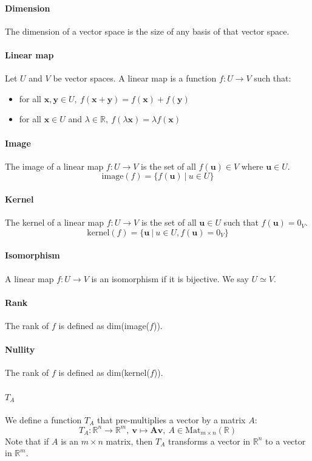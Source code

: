 \documentclass{article}
\newcommand{\R}{\mathbb{R}}
\renewcommand{\vec}[1]{\mathbf{#1}}
\begin{document}
\paragraph{Dimension}
The dimension of a vector space is the size of any basis of that vector space.
\paragraph{Linear map}
Let $ U $ and $ V $ be vector spaces. A linear map is a function $ f : U \to V $ such that:
\begin{itemize}
\item for all $ \vec{x}, \vec{y} \in U, \ f(\vec{x} + \vec{y}) = f(\vec{x}) + f(\vec{y}) $
\item for all $ \vec{x} \in U $ and $ \lambda \in \R, \ f(\lambda \vec{x}) = \lambda f(\vec{x}) $
\end{itemize}
\paragraph{Image}
The image of a linear map $ f : U \to V $ is the set of all $ f(\vec{u}) \in V $ where $ \vec{u} \in U $.
\begin{equation}
\textrm{image}(f) = \{f(\vec{u}) \ | \ u \in U \}
\end{equation}
\paragraph{Kernel}
The kernel of a linear map $ f : U \to V $ is the set of all $ \vec{u} \in U $ such that $ f(\vec{u}) = 0_{V} $.
\begin{equation}
\textrm{kernel}(f) = \{\vec{u} \ | \ u \in U, f(\vec{u}) = 0_{V} \}
\end{equation}
\paragraph{Isomorphism}
A linear map $ f : U \to V $ is an isomorphism if it is bijective. We say $ U \simeq V $.
\paragraph{Rank}
The rank of $ f $ is defined as dim(image($ f $)).
\paragraph{Nullity}
The rank of $ f $ is defined as dim(kernel($ f $)).
\paragraph{$ T_{A} $}
We define a function $ T_{A} $ that pre-multiplies a vector by a matrix $ A $:
\begin{equation}
T_{A} : \R^{n} \to \R^{m}, \ \vec{v} \mapsto \vec{A}\vec{v}, \ A \in \textrm{Mat}_{m \times n}(\R)
\end{equation}
Note that if $ A $ is an $ m \times n $ matrix, then $ T_{A} $ transforms a vector in $ \R^{n} $ to a vector in $ \R^{m} $.
\end{document}
